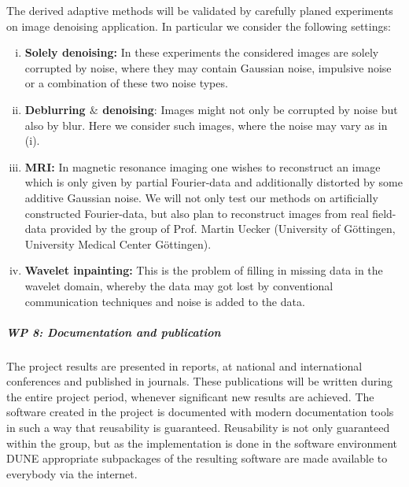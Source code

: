 \documentclass[enabledeprecatedfontcommands,cleardoublepage=empty,headsepline,twoside,11pt,DIV=15,BCOR=12mm,final]{scrartcl}
\begin{document}
The derived adaptive methods will be validated by carefully planed experiments on image denoising application. In particular we consider the following settings:

\begin{enumerate}[(i)]
\item \textbf{Solely denoising:} In these experiments the considered images are solely corrupted by noise, where they may contain Gaussian noise, impulsive noise or a combination of these two noise types.

\item \textbf{Deblurring $\&$ denoising}: Images might not only be corrupted by noise but also by blur. Here we consider such images, where the noise may vary as in (i).

\item \textbf{MRI:} In magnetic resonance imaging one wishes to reconstruct an image which is only given by partial Fourier-data and additionally distorted by some additive Gaussian noise. We will not only test our methods on artificially constructed Fourier-data, but also plan to reconstruct images from real field-data provided by the group of Prof. Martin Uecker (University of G\"ottingen, University Medical Center G\"ottingen).

\item \textbf{Wavelet inpainting:} This is the problem of filling in missing data in the wavelet domain, whereby the data may got lost by conventional communication techniques and noise is added to the data. 

\end{enumerate}


 
 \subparagraph{WP 8: Documentation and publication}
 
 The project results are presented in reports, at national and international conferences and published in journals. These publications will be written during the entire project period, whenever significant new results are achieved. The software created in the project is documented with modern documentation tools in such a way that reusability is guaranteed. Reusability is not only guaranteed within the group, but as the implementation is done in the software environment DUNE appropriate subpackages of the resulting software are made available to everybody via the internet.
 
\end{document}
